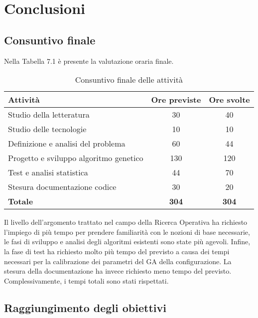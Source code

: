 \chapter{Conclusioni}
\label{cap:conclusioni}


\section{Consuntivo finale}

Nella Tabella 7.1 è presente la valutazione oraria finale.

\begin{table}[H]
    \centering
    \begin{tabular}{|l|c|c|}
    \hline
    \textbf{Attività} & \textbf{Ore previste} & \textbf{Ore svolte} \\  \hline
    Studio della letteratura & 30 & 40 \\  \hline
    Studio delle tecnologie & 10 & 10 \\  \hline
    Definizione e analisi del problema & 60 & 44 \\  \hline
    Progetto e sviluppo algoritmo genetico & 130 & 120 \\  \hline
    Test e analisi statistica & 44 & 70 \\  \hline
    Stesura documentazione codice & 30 & 20 \\  \hline
    \textbf{Totale} & \textbf{304} & \textbf{304} \\  \hline
    \end{tabular}
    \caption{Consuntivo finale delle attività}
\end{table}

Il livello dell'argomento trattato nel campo della Ricerca Operativa ha richiesto l'impiego di più tempo per prendere familiarità con le nozioni di base necessarie, le fasi di sviluppo e analisi degli algoritmi esistenti sono state più agevoli. Infine, la fase di test ha richiesto molto più tempo del previsto a causa dei tempi necessari per la calibrazione dei parametri del GA della configurazione. La stesura della documentazione ha invece richiesto meno tempo del previsto. Complessivamente, i tempi totali sono stati rispettati.

\section{Raggiungimento degli obiettivi}

